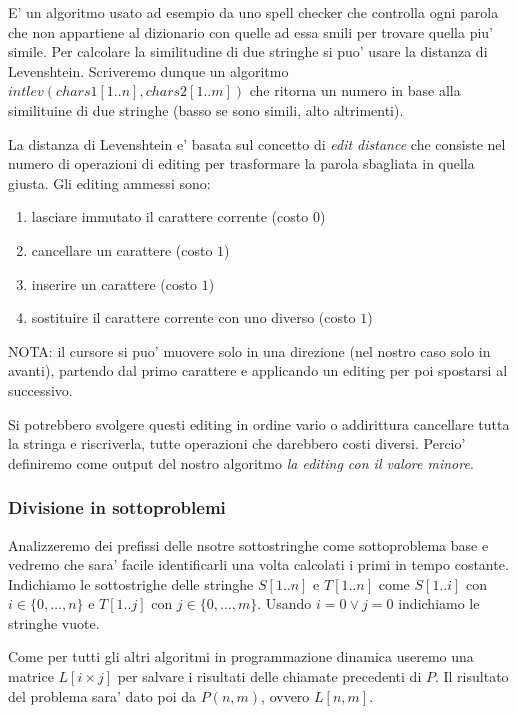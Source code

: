 \documentclass{article}
\begin{document}
E' un algoritmo usato ad esempio da uno spell checker che controlla ogni parola
che non appartiene al dizionario con quelle ad essa smili per trovare quella piu'
simile. Per calcolare la similitudine di due stringhe si puo' usare la distanza
di Levenshtein. Scriveremo dunque un algoritmo $int lev(char s1[1..n], char s2[1..m])$
che ritorna un numero in base alla similituine di due stringhe (basso se sono simili,
alto altrimenti).

La distanza di Levenshtein e' basata sul concetto di \emph{edit distance} che consiste
nel numero di operazioni di editing per trasformare la parola sbagliata in quella giusta.
Gli editing ammessi sono:

\begin{enumerate}
  \item lasciare immutato il carattere corrente (costo $0$)
  \item cancellare un carattere (costo $1$)
  \item inserire un carattere (costo $1$)
  \item sostituire il carattere corrente con uno diverso (costo $1$)
\end{enumerate}

NOTA: il cursore si puo' muovere solo in una direzione (nel nostro caso solo in avanti),
partendo dal primo carattere e applicando un editing per poi spostarsi al successivo.

Si potrebbero svolgere questi editing in ordine vario o addirittura cancellare
tutta la stringa e riscriverla, tutte operazioni che darebbero costi diversi.
Percio' definiremo come output del nostro algoritmo \emph{la editing con il valore minore}.

\subsubsection{Divisione in sottoproblemi}

Analizzeremo dei prefissi delle nsotre sottostringhe come sottoproblema base e
vedremo che sara' facile identificarli una volta calcolati i primi in tempo costante.
Indichiamo le sottostrighe delle stringhe $S[1..n]$ e $T[1..n]$ come $S[1..i]$
con $i \in \{ 0, \ldots, n \}$ e $T[1..j]$ con $j \in \{ 0, \ldots, m \}$. Usando
$i = 0 \vee j = 0$ indichiamo le stringhe vuote.

Come per tutti gli altri algoritmi in programmazione dinamica useremo una matrice
$L[i \times j]$ per salvare i risultati delle chiamate precedenti di $P$. Il
risultato del problema sara' dato poi da $P(n, m)$, ovvero $L[n, m]$.
\end{document}
